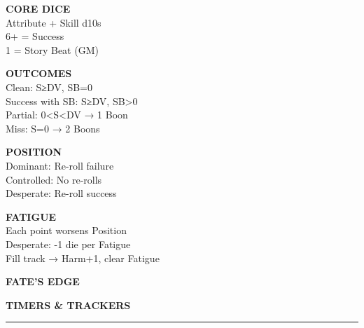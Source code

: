 \documentclass[11pt]{article}
\begin{document}
\begin{tcolorbox}[colback=fe-silk!20, colframe=fe-dusk, boxrule=0.5pt, sharp corners, width=\linewidth]
  \begin{minipage}[t]{0.22\linewidth}
    {\bfseries\color{fe-dusk} CORE DICE}\\
    {\small Attribute + Skill d10s}\\
    {\small 6+ = Success}\\
    {\small 1 = Story Beat (GM)}
  \end{minipage}
  \hfill
  \begin{minipage}[t]{0.25\linewidth}
    {\bfseries\color{fe-dusk} OUTCOMES}\\
    {\small Clean: S≥DV, SB=0}\\
    {\small Success with SB: S≥DV, SB>0}\\
    {\small Partial: 0<S<DV → 1 Boon}\\
    {\small Miss: S=0 → 2 Boons}
  \end{minipage}
  \hfill
  \begin{minipage}[t]{0.25\linewidth}
    {\bfseries\color{fe-dusk} POSITION}\\
    {\small Dominant: Re-roll failure}\\
    {\small Controlled: No re-rolls}\\
    {\small Desperate: Re-roll success}
  \end{minipage}
  \hfill
  \begin{minipage}[t]{0.22\linewidth}
    {\bfseries\color{fe-dusk} FATIGUE}\\
    {\small Each point worsens Position}\\
    {\small Desperate: -1 die per Fatigue}\\
    {\small Fill track → Harm+1, clear Fatigue}
  \end{minipage}
\end{tcolorbox}

\newpage

\begin{minipage}[t]{0.45\linewidth}
  {\Large\bfseries\color{fe-dusk} FATE'S EDGE}
\end{minipage}
\hfill
\begin{minipage}[t]{0.45\linewidth}
  \raggedleft
  {\large\bfseries\color{fe-dusk} TIMERS \& TRACKERS}
\end{minipage}
\vspace{0.2cm}
\hrule
\end{document}
